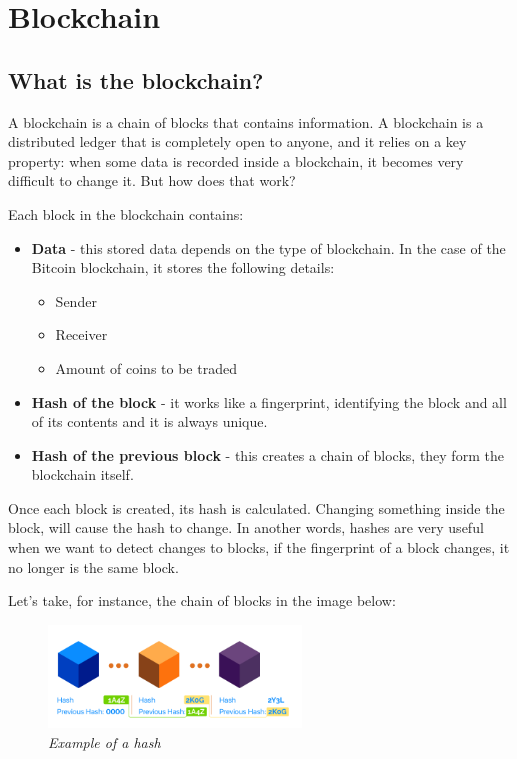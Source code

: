 \documentclass{article}
\newcommand\tab[1][1cm]{\hspace*{#1}}
\begin{document}
\section{Blockchain}

\subsection{What is the blockchain?}

\tab A blockchain is a chain of blocks that contains information. A blockchain is a distributed ledger that is completely open to anyone, and it relies on a key property: when some data is recorded inside a blockchain, it becomes very difficult to change it. But how does that work?

Each block in the blockchain contains:

\begin{itemize}
    \item \textbf{Data} - this stored data depends on the type of blockchain. In the case of the Bitcoin blockchain, it stores the following details:
    \begin{itemize}
        \item Sender
        \item Receiver
        \item Amount of coins to be traded
    \end{itemize}
    \item \textbf{Hash of the block} - it works like a fingerprint, identifying the block and all of its contents and it is always unique.
    \item \textbf{Hash of the previous block} - this creates a chain of blocks, they form the blockchain itself.
\end{itemize}

Once each block is created, its hash is calculated. Changing something inside the block, will cause the hash to change. In another words, hashes are very useful when we want to detect changes to blocks, if the fingerprint of a block changes, it no longer is the same block.

Let's take, for instance, the chain of blocks in the image below:

\begin{figure}[H]
    \begin{center}
        \includegraphics[width=0.6\textwidth]{images/changes_in_block.png}
        \caption{\textit{Example of a hash}}
    \end{center}
\end{figure}
\end{document}
